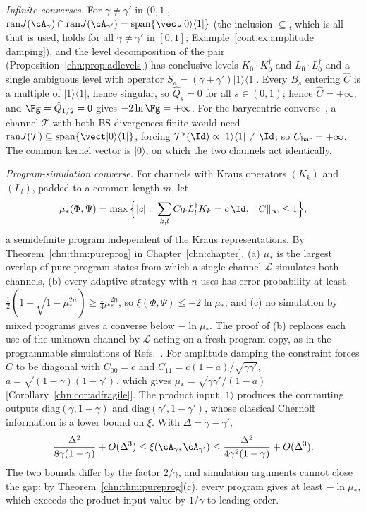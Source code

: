 \emph{Infinite converses.} For $\gamma\ne\gamma'$ in $(0,1]$, $\mathrm{ran}J(\cA_\gamma)\cap\mathrm{ran}J(\cA_{\gamma'})=\mathrm{span}\{\vect|0\rangle\langle1|\}$ (the inclusion $\subseteq$, which is all that is used, holds for all $\gamma\ne\gamma'$ in $[0,1]$; Example~\ref{cont:ex:amplitude damping}), and the level decomposition of the pair (Proposition~\ref{chn:prop:adlevels}) has conclusive levels $K_0\cdot K_0^\dagger$ and $L_0\cdot L_0^\dagger$ and a single ambiguous level with operator $S_a=(\gamma+\gamma')|1\rangle\langle1|$. Every $B_s$ entering $\hat C$ is a multiple of $|1\rangle\langle1|$, hence singular, so $\hat Q_s=0$ for all $s\in(0,1)$; hence $\hat C=+\infty$, and $\Fg=\hat Q_{1/2}=0$ gives $-2\ln\Fg=+\infty$. For the barycentric converse~\cite{JMMW2024}, a channel $\mathcal T$ with both BS divergences finite would need $\mathrm{ran}J(\mathcal T)\subseteq\mathrm{span}\{\vect|0\rangle\langle1|\}$, forcing $\mathcal T^*(\Id)\propto|1\rangle\langle1|\ne\Id$; so $C_{\rm bar}=+\infty$. The common kernel vector is $|0\rangle$, on which the two channels act identically.

\emph{Program-simulation converse.} For channels with Kraus operators $(K_k)$ and $(L_l)$, padded to a common length $m$, let
\begin{equation}
\mu_*(\Phi,\Psi)=\max\Big\{|c|:\ \sum_{k,l}C_{lk}L_l^\dagger K_k=c\,\Id,\ \|C\|_\infty\le1\Big\},
\end{equation}
a semidefinite program independent of the Kraus representations. By Theorem~\ref{chn:thm:pureprog} in Chapter~\ref{chn:chapter}, (a) $\mu_*$ is the largest overlap of pure program states from which a single channel $\mathcal L$ simulates both channels, (b) every adaptive strategy with $n$ uses has error probability at least $\frac12(1-\sqrt{1-\mu_*^{2n}})\ge\frac14\mu_*^{2n}$, so $\xi(\Phi,\Psi)\le-2\ln\mu_*$, and (c) no simulation by mixed programs gives a converse below $-\ln\mu_*$. The proof of (b) replaces each use of the unknown channel by $\mathcal L$ acting on a fresh program copy, as in the programmable simulations of Refs.~\cite{PirandolaLupo2017,Pirandola2019}. For amplitude damping the constraint forces $C$ to be diagonal with $C_{00}=c$ and $C_{11}=c(1-a)/\sqrt{\gamma\gamma'}$, $a=\sqrt{(1-\gamma)(1-\gamma')}$, which gives $\mu_*=\sqrt{\gamma\gamma'}/(1-a)$ [Corollary~\ref{chn:cor:adfragile}]. The product input $|1\rangle$ produces the commuting outputs $\mathrm{diag}(\gamma,1-\gamma)$ and $\mathrm{diag}(\gamma',1-\gamma')$, whose classical Chernoff information is a lower bound on $\xi$. With $\Delta=\gamma-\gamma'$,
\begin{equation}
\frac{\Delta^2}{8\gamma(1-\gamma)}+O(\Delta^3)\le\xi(\cA_\gamma,\cA_{\gamma'})\le\frac{\Delta^2}{4\gamma^2(1-\gamma)}+O(\Delta^3).
\end{equation}
The two bounds differ by the factor $2/\gamma$, and simulation arguments cannot close the gap: by Theorem~\ref{chn:thm:pureprog}(c), every program gives at least $-\ln\mu_*$, which exceeds the product-input value by $1/\gamma$ to leading order.


